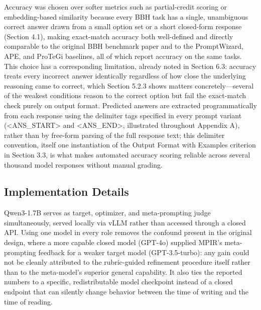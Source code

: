 \documentclass[a4paper,fleqn]{cas-sc}
\begin{document}
Accuracy was chosen over softer metrics such as partial-credit scoring or embedding-based similarity because every BBH task has a single, unambiguous correct answer drawn from a small option set or a short closed-form response (Section 4.1), making exact-match accuracy both well-defined and directly comparable to the original BBH benchmark paper and to the PromptWizard, APE, and ProTeGi baselines, all of which report accuracy on the same tasks. This choice has a corresponding limitation, already noted in Section 6.3: accuracy treats every incorrect answer identically regardless of how close the underlying reasoning came to correct, which Section 5.2.3 shows matters concretely---several of the weakest conditions reason to the correct option but fail the exact-match check purely on output format. Predicted answers are extracted programmatically from each response using the delimiter tags specified in every prompt variant (<ANS\_\allowbreak{}START> and <ANS\_\allowbreak{}END>, illustrated throughout Appendix A), rather than by free-form parsing of the full response text; this delimiter convention, itself one instantiation of the Output Format with Examples criterion in Section 3.3, is what makes automated accuracy scoring reliable across several thousand model responses without manual grading.

\subsection{Implementation Details}

Qwen3-1.7B \citep{qwenteam2025} serves as target, optimizer, and meta-prompting judge simultaneously, served locally via vLLM rather than accessed through a closed API. Using one model in every role removes the confound present in the original design, where a more capable closed model (GPT-4o) supplied MPIR's meta-prompting feedback for a weaker target model (GPT-3.5-turbo): any gain could not be cleanly attributed to the rubric-guided refinement procedure itself rather than to the meta-model's superior general capability. It also ties the reported numbers to a specific, redistributable model checkpoint instead of a closed endpoint that can silently change behavior between the time of writing and the time of reading.
\end{document}
